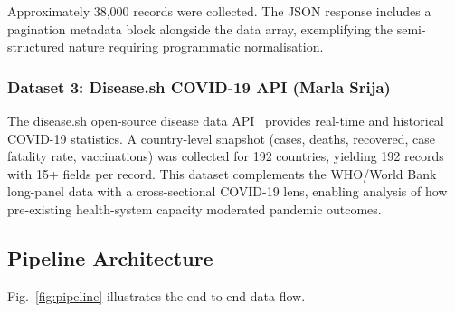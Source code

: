 \documentclass[conference]{IEEEtran}
\begin{document}
Approximately 38,000 records were collected. The JSON response includes a
pagination metadata block alongside the data array, exemplifying the
semi-structured nature requiring programmatic normalisation.

\subsubsection{Dataset 3: Disease.sh COVID-19 API (Marla Srija)}
The disease.sh open-source disease data API~\cite{diseasesh} provides
real-time and historical COVID-19 statistics. A country-level snapshot
(cases, deaths, recovered, case fatality rate, vaccinations) was collected
for 192 countries, yielding 192 records with 15+ fields per record. This
dataset complements the WHO/World Bank long-panel data with a cross-sectional
COVID-19 lens, enabling analysis of how pre-existing health-system capacity
moderated pandemic outcomes.

\subsection{Pipeline Architecture}

Fig.~\ref{fig:pipeline} illustrates the end-to-end data flow.
\end{document}
